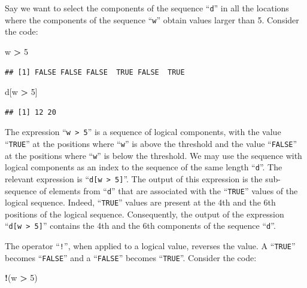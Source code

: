 \documentclass[]{krantz}
\makeatletter
\newenvironment{Shaded}{\begin{snugshade}}{\end{snugshade}}
\newcommand{\DecValTok}[1]{\textcolor[rgb]{0.00,0.00,0.81}{#1}}
\newcommand{\NormalTok}[1]{#1}
\newcommand{\OperatorTok}[1]{\textcolor[rgb]{0.81,0.36,0.00}{\textbf{#1}}}
\newcommand{\StringTok}[1]{\textcolor[rgb]{0.31,0.60,0.02}{#1}}
\newenvironment{kframe}{%
\medskip{}
\setlength{\fboxsep}{.8em}
 \def\at@end@of@kframe{}%
 \ifinner\ifhmode%
  \def\at@end@of@kframe{\end{minipage}}%
  \begin{minipage}{\columnwidth}%
 \fi\fi%
 \def\FrameCommand##1{\hskip\@totalleftmargin \hskip-\fboxsep
 \colorbox{shadecolor}{##1}\hskip-\fboxsep
     \hskip-\linewidth \hskip-\@totalleftmargin \hskip\columnwidth}%
 \MakeFramed {\advance\hsize-\width
   \@totalleftmargin\z@ \linewidth\hsize
   \@setminipage}}%
 {\par\unskip\endMakeFramed%
 \at@end@of@kframe}
\renewenvironment{Shaded}{\begin{kframe}}{\end{kframe}}
\theoremstyle{definition}
\theoremstyle{definition}
\theoremstyle{definition}
\theoremstyle{remark}
\makeatother
\begin{document}
Say we want to select the components of the sequence ``\texttt{d}'' in all the
locations where the components of the sequence ``\texttt{w}'' obtain values
larger than 5. Consider the code:

\begin{Shaded}
\begin{Highlighting}[]
\NormalTok{w }\OperatorTok{>}\StringTok{ }\DecValTok{5}
\end{Highlighting}
\end{Shaded}

\begin{verbatim}
## [1] FALSE FALSE FALSE  TRUE FALSE  TRUE
\end{verbatim}

\begin{Shaded}
\begin{Highlighting}[]
\NormalTok{d[w }\OperatorTok{>}\StringTok{ }\DecValTok{5}\NormalTok{]}
\end{Highlighting}
\end{Shaded}

\begin{verbatim}
## [1] 12 20
\end{verbatim}

The expression ``\texttt{w\ \textgreater{}\ 5}'' is a sequence of logical components, with the
value ``\texttt{TRUE}'' at the positions where ``\texttt{w}'' is above the threshold and
the value ``\texttt{FALSE}'' at the positions where ``\texttt{w}'' is below the threshold.
We may use the sequence with logical components as an index to the
sequence of the same length ``\texttt{d}''. The relevant expression is
``\texttt{d{[}w\ \textgreater{}\ 5{]}}''. The output of this expression is the sub-sequence of
elements from ``\texttt{d}'' that are associated with the ``\texttt{TRUE}'' values of the
logical sequence. Indeed, ``\texttt{TRUE}'' values are present at the 4th and the
6th positions of the logical sequence. Consequently, the output of the
expression ``\texttt{d{[}w\ \textgreater{}\ 5{]}}'' contains the 4th and the 6th components of the
sequence ``\texttt{d}''.

The operator ``\texttt{!}'', when applied to a logical value, reverses the value.
A ``\texttt{TRUE}'' becomes ``\texttt{FALSE}'' and a ``\texttt{FALSE}'' becomes ``\texttt{TRUE}''. Consider
the code:

\begin{Shaded}
\begin{Highlighting}[]
\OperatorTok{!}\NormalTok{(w }\OperatorTok{>}\StringTok{ }\DecValTok{5}\NormalTok{)}
\end{Highlighting}
\end{Shaded}
\end{document}
